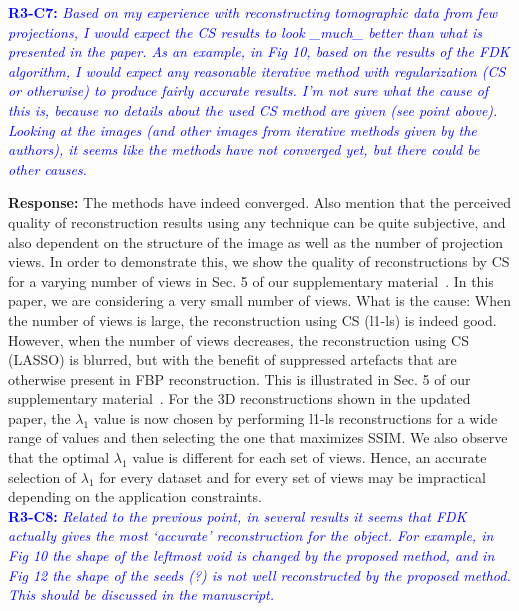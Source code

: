 \documentclass{article}
\begin{document}
\textcolor{blue}{\textbf{R3-C7:}\textit{ Based on my experience with reconstructing tomographic data from few projections, I would expect the CS results to look \_much\_ better than what is presented in the paper. As an example, in Fig 10, based on the results of the FDK algorithm, I would expect any reasonable iterative method with regularization (CS or otherwise) to produce fairly accurate results. I'm not sure what the cause of this is, because no details about the used CS method are given (see point above). Looking at the images (and other images from iterative methods given by the authors), it seems like the methods have not converged yet, but there could be other causes.}}

\textbf{Response:} The methods have indeed converged. Also mention that the perceived quality of reconstruction results using any technique can be quite subjective, and also dependent on the structure of the image as well as the number of projection views. In order to demonstrate this, we show the quality of reconstructions by CS for a varying number of views in Sec. 5 of our supplementary material~\cite{supp_paper}. In this paper, we are considering a very small number of views.  
What is the cause: When the number of views is large, the reconstruction using CS (l1-ls) is indeed good. However, when the number of views decreases, the reconstruction using CS (LASSO) is blurred, but with the benefit of suppressed artefacts that are otherwise present in FBP reconstruction. This is illustrated in Sec. 5 of our supplementary material~\cite{supp_paper}.      
For the 3D reconstructions shown in the updated paper, the $\lambda_1$ value is now chosen by performing l1-ls reconstructions for a wide range of values and then selecting the one that maximizes SSIM.
We also observe that the optimal $\lambda_1$ value is different for each set of views. Hence, an accurate selection of $\lambda_1$ for every dataset and for every set of views may be impractical depending on the application constraints.\\

\textcolor{blue}{\textbf{R3-C8:}\textit{ Related to the previous point, in several results it seems that FDK actually gives the most `accurate' reconstruction for the object. For example, in Fig 10 the shape of the leftmost void is changed by the proposed method, and in Fig 12 the shape of the seeds (?) is not well reconstructed by the proposed method. This should be discussed in the manuscript.}}
    
\end{document}
